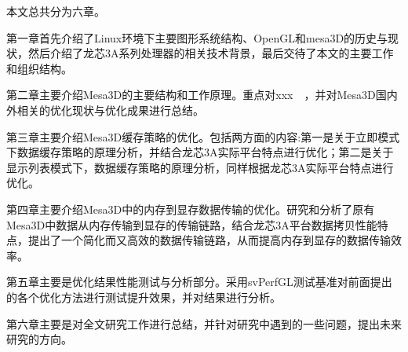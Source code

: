 
本文总共分为六章。

第一章首先介绍了Linux环境下主要图形系统结构、OpenGL和mesa3D的历史与现状，然后介绍了龙芯3A系列处理器的相关技术背景，最后交待了本文的主要工作和组织结构。

第二章主要介绍Mesa3D的主要结构和工作原理。重点对xxx　，并对Mesa3D国内外相关的优化现状与优化成果进行总结。

第三章主要介绍Mesa3D缓存策略的优化。包括两方面的内容:第一是关于立即模式下数据缓存策略的原理分析，并结合龙芯3A实际平台特点进行优化；第二是关于显示列表模式下，数据缓存策略的原理分析，同样根据龙芯3A实际平台特点进行优化。

第四章主要介绍Mesa3D中的内存到显存数据传输的优化。研究和分析了原有Mesa3D中数据从内存传输到显存的传输链路，结合龙芯3A平台数据拷贝性能特点，提出了一个简化而又高效的数据传输链路，从而提高内存到显存的数据传输效率。

第五章主要是优化结果性能测试与分析部分。采用svPerfGL测试基准对前面提出的各个优化方法进行测试提升效果，并对结果进行分析。

第六章主要是对全文研究工作进行总结，并针对研究中遇到的一些问题，提出未来研究的方向。
